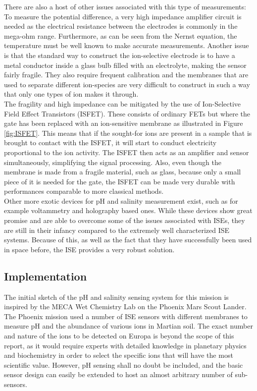 \noindent
There are also a host of other issues associated with this type of measurements: To measure the potential difference, a very high impedance amplifier circuit is needed as the electrical resistance between the electrodes is commonly in the mega-ohm range\cite{website:ph3}. Furthermore, as can be seen from the Nernst equation, the temperature must be well known to make accurate measurements. Another issue is that the standard way to construct the ion-selective electrode is to have a metal conductor inside a glass bulb filled with an electrolyte, making the sensor fairly fragile. They also require frequent calibration and the membranes that are used to separate different ion-species are very difficult to construct in such a way that only one types of ion makes it through\cite{website:ph1}.\\

\noindent
The fragility and high impedance can be mitigated by the use of Ion-Selective Field Effect Transistors (ISFET). These consists of ordinary FETs but where the gate has been replaced with an ion-sensitive membrane as illustrated in Figure \ref{fig:ISFET}. This means that if the sought-for ions are present in a sample that is brought to contact with the ISFET, it will start to conduct electricity proportional to the ion activity. The ISFET then acts as an amplifier and sensor simultaneously, simplifying the signal processing\cite{website:ph4}. Also, even though the membrane is made from a fragile material, such as glass, because only a small piece of it is needed for the gate, the ISFET can be made very durable with performances comparable to more classical methods\cite{website:ph4}. \\ 

\noindent
Other more exotic devices for pH and salinity measurement exist, such as for example voltammetry\cite{website:senova} and holography\cite{article:marshall2003a} based ones. While these devices show great promise and are able to overcome some of the issues associated with ISEs, they are still in their infancy compared to the extremely well characterized ISE systems. Because of this, as well as the fact that they have successfully been used in space before\cite{article:jgre2487}, the ISE provides a very robust solution.

\subsection{Implementation}
The initial sketch of the pH and salinity sensing system for this mission is inspired by the MECA Wet Chemistry Lab on the Phoenix Mars Scout Lander. The Phoenix mission used a number of ISE sensors with different membranes to measure pH and the abundance of various ions in Martian soil\cite{article:jgre2487}. The exact number and nature of the ions to be detected on Europa is beyond the scope of this report, as it would require experts with detailed knowledge in planetary physics and biochemistry in order to select the specific ions that will have the most scientific value. However, pH sensing shall no doubt be included, and the basic sensor design can easily be extended to host an almost arbitrary number of sub-sensors.\\

